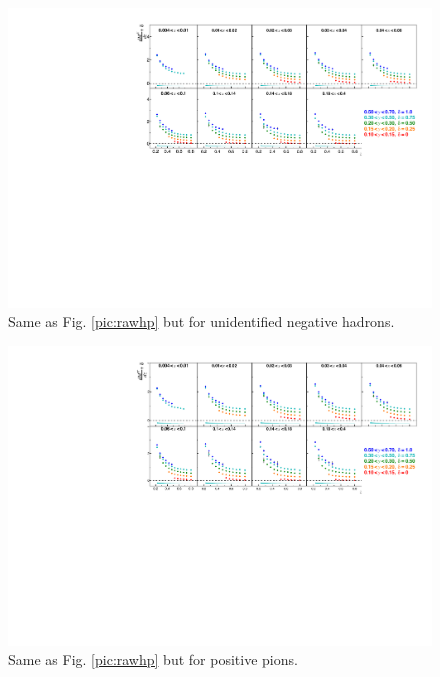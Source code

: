 \newpage

\begin{figure}[!h]
  \includegraphics[scale=0.85]{./gfx/rawhm.pdf}
  \caption{Same as Fig. \ref{pic:rawhp} but for unidentified negative hadrons.}
  \label{pic:rawhm}
\end{figure}

\begin{figure}[!h]
  \includegraphics[scale=0.85]{./gfx/rawpip.pdf}
  \caption{Same as Fig. \ref{pic:rawhp} but for positive pions.}
  \label{pic:rawpip}
\end{figure}

\newpage

